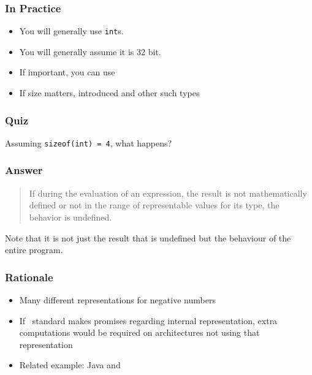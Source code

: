 \documentclass{../ucll-slides}
\begin{document}
\begin{frame}
  \frametitle{In Practice}
  \begin{itemize}
    \item You will generally use {\tt int}s.
    \item You will generally assume it is 32 bit.
    \item If important, you can use 
    \item If size matters,  introduced  and other such types
  \end{itemize}
\end{frame}

\begin{frame}
  \frametitle{Quiz}
  \begin{center}
    \Large Assuming {\tt sizeof(int) = 4}, what happens?
  \end{center}
\end{frame}

\begin{frame}
  \frametitle{Answer}
  \begin{quote}
    If during the evaluation of an expression, the result is not mathematically defined or not in the range of
    representable values for its type, the behavior is undefined. \\
    \hfill {}
  \end{quote}
  \vskip5mm
  Note that it is not just the result that is undefined but the behaviour of the entire program.
\end{frame}

\begin{frame}
  \frametitle{Rationale}
  \begin{itemize}
    \item Many different representations for negative numbers
    \item If \cpp\ standard makes promises regarding internal representation,
          extra computations would be required on architectures not using that representation
    \item Related example: Java and 
  \end{itemize}
\end{frame}
\end{document}
